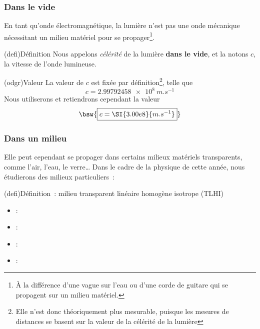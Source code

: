 \documentclass[../../main/main.tex]{subfiles}
\begin{document}
\subsubsection{Dans le vide}

En tant qu'onde électromagnétique, la lumière n'est pas une onde mécanique
nécessitant un milieu matériel pour se propager\footnote{À la différence d'une
	vague sur l'eau ou d'une corde de guitare qui se propagent sur un milieu
	matériel.}.
\begin{tcb*}(defi){Définition}
	Nous appelons \textit{célérité} de la lumière \textbf{dans le vide}, et
	la notons $c$, la vitesse de l'onde lumineuse.
\end{tcb*}
\begin{tcb*}[sidebyside](odgr){Valeur}
	La valeur de $c$ est fixée par définition\footnote{Elle n'est donc
		théoriquement plus mesurable, puisque les mesures de distances se basent sur
		la valeur de la célérité de la lumière}, telle que
	\[c = \SI{2.99792458e8}{m.s^{-1}}\]
	\tcblower
	Nous utiliserons et retiendrons cependant la valeur
	\[
		\bsw{
			\boxed{c = \SI{3.00e8}{m.s^{-1}}}
		}
	\]
\end{tcb*}

\subsubsection{Dans un milieu}

Elle peut cependant se propager dans certains milieux matériels transparents,
comme l'air, l'eau, le verre… Dans le cadre de la physique de cette année, nous
étudierons des milieux particuliers~:

\begin{tcb*}(defi){Définition~: milieu transparent linéaire homogène isotrope (TLHI)}
	\begin{itemize}[leftmargin=66pt]
		\item[\textbf{Transparent}] : 
		\item[\textbf{Linéaire}] : 
		\item[\textbf{Homogène}] : 
		\item[\textbf{Isotrope}] : 
	\end{itemize}
\end{tcb*}
\end{document}

